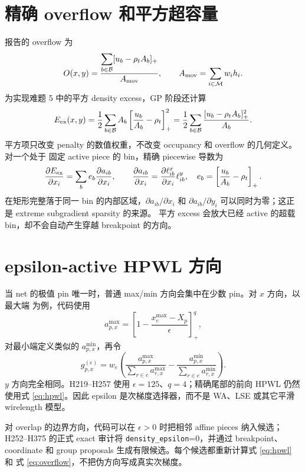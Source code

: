\documentclass[UTF8,a4paper,11pt]{ctexrep}
\newcommand{\M}{\mathcal{M}}
\newcommand{\Bset}{\mathcal{B}}
\begin{document}
\section{精确 overflow 和平方超容量}
报告的 overflow 为
\begin{equation}
 O(x,y)=\frac{\displaystyle\sum_{b\in\Bset}[u_b-\rho_tA_b]_+}
 {A_{\rm mov}},
 \qquad A_{\rm mov}=\sum_{i\in\M}w_ih_i.
 \label{eq:overflow}
\end{equation}
为实现难题 5 中的平方 density excess，GP 阶段还计算
\begin{equation}
 E_{\rm ex}(x,y)=
 \frac12\sum_{b\in\Bset}A_b
 \left[\frac{u_b}{A_b}-\rho_t\right]_+^2
 =\frac12\sum_{b\in\Bset}
 \frac{[u_b-\rho_tA_b]_+^2}{A_b}.
 \label{eq:excess}
\end{equation}
平方项只改变 penalty 的数值权重，不改变 occupancy 和 overflow 的几何定义。对一个处于
固定 active piece 的 bin，精确 piecewise 导数为
\begin{equation}
 \frac{\partial E_{\rm ex}}{\partial x_i}
 =\sum_b e_b\frac{\partial a_{ib}}{\partial x_i},
 \qquad
 \frac{\partial a_{ib}}{\partial x_i}
 =\frac{\partial\ell^x_{ib}}{\partial x_i}\ell^y_{ib},
 \quad
 e_b=\left[\frac{u_b}{A_b}-\rho_t\right]_+.
 \label{eq:densitygrad}
\end{equation}
在矩形完整落于同一 bin 的内部区域，$\partial a_{ib}/\partial x_i$ 和
$\partial a_{ib}/\partial y_i$ 可以同时为零；这正是 extreme subgradient sparsity 的来源。
平方 excess 会放大已经 active 的超载 bin，却不会自动产生穿越 breakpoint 的方向。

\section{epsilon-active HPWL 方向}
当 net 的极值 pin 唯一时，普通 max/min 方向会集中在少数 pin。对 $x$ 方向，以最大端
为例，代码使用
\[
 a^{\max}_{p,x}=\left[1-\frac{x_e^{\max}-X_p}{\epsilon}\right]_+^q,
\]
对最小端定义类似的 $a^{\min}_{p,x}$，再令
\begin{equation}
 g_{p,x}^{(e)}=w_e\left(
 \frac{a^{\max}_{p,x}}{\sum_{r\in e}a^{\max}_{r,x}}
 -\frac{a^{\min}_{p,x}}{\sum_{r\in e}a^{\min}_{r,x}}
 \right).
 \label{eq:epshpwl}
\end{equation}
$y$ 方向完全相同。H219--H257 使用 $\epsilon=125$、$q=4$；精确尾部的前向 HPWL
仍然使用式 \eqref{eq:hpwl}。因此 epsilon 是次梯度选择器，而不是 WA、LSE 或其它平滑
wirelength 模型。

对 overlap 的边界方向，代码可以在 $\epsilon>0$ 时把相邻 affine pieces 纳入候选；
H252--H375 的正式 exact 审计将 \texttt{density\_epsilon}=0，并通过 breakpoint、
coordinate 和 group proposals 生成有限候选。每个候选都重新计算式 \eqref{eq:hpwl} 和
式 \eqref{eq:overflow}，不把伪方向写成真实次梯度。
\end{document}
